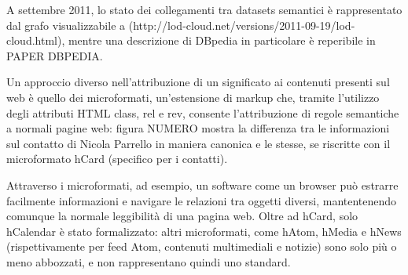 \documentclass[sigproc-sp.tex]{subfiles}
\begin{document}
A settembre 2011, lo stato dei collegamenti tra datasets semantici è rappresentato dal grafo visualizzabile a (http://lod-cloud.net/versions/2011-09-19/lod-cloud.html), mentre una descrizione di DBpedia in particolare è reperibile in PAPER DBPEDIA.

Un approccio diverso nell’attribuzione di un significato ai contenuti presenti sul web è quello dei microformati, un’estensione di markup che, tramite l’utilizzo degli attributi HTML class, rel e rev, consente l’attribuzione di regole semantiche a normali pagine web: figura NUMERO mostra la differenza tra le informazioni sul contatto di Nicola Parrello in maniera canonica e le stesse, se 
riscritte con il microformato hCard (specifico per i contatti).

Attraverso i microformati, ad esempio, un software come un browser può estrarre facilmente informazioni e navigare le relazioni tra oggetti diversi, mantentenendo comunque la normale leggibilità di una pagina web. Oltre ad hCard, solo hCalendar è stato formalizzato: altri microformati, come hAtom, hMedia e hNews (rispettivamente per feed Atom, contenuti multimediali e notizie) sono solo più o meno abbozzati, e non rappresentano quindi uno standard.
\end{document}
